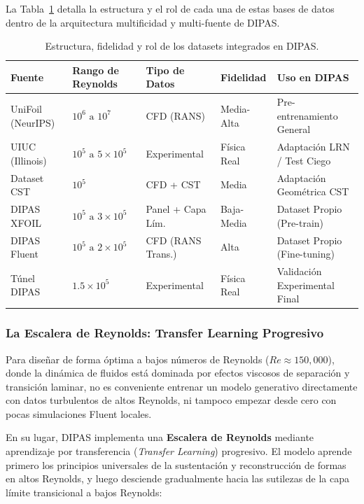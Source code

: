 \begin{enumerate}
La Tabla~\ref{tab:datasets_multifidelidad} detalla la estructura y el rol de cada una de estas bases de datos dentro de la arquitectura multificidad y multi-fuente de DIPAS.

\begin{table}[htbp]
\centering
\caption{Estructura, fidelidad y rol de los datasets integrados en DIPAS.}
\label{tab:datasets_multifidelidad}
\small
\begin{tabular}{@{}lllll@{}}
\toprule
\textbf{Fuente} & \textbf{Rango de Reynolds} & \textbf{Tipo de Datos} & \textbf{Fidelidad} & \textbf{Uso en DIPAS} \\ \midrule
UniFoil (NeurIPS) & $10^6\text{ a }10^7$ & CFD (RANS) & Media-Alta & Pre-entrenamiento General \\
UIUC (Illinois) & $10^5\text{ a }5\times 10^5$ & Experimental & Física Real & Adaptación LRN / Test Ciego \\
Dataset CST & $10^5$ & CFD + CST & Media & Adaptación Geométrica CST \\
DIPAS XFOIL & $10^5\text{ a }3\times 10^5$ & Panel + Capa Lím. & Baja-Media & Dataset Propio (Pre-train) \\
DIPAS Fluent & $10^5\text{ a }2\times 10^5$ & CFD (RANS Trans.) & Alta & Dataset Propio (Fine-tuning) \\
Túnel DIPAS & $1.5\times 10^5$ & Experimental & Física Real & Validación Experimental Final \\ \bottomrule
\end{tabular}
\end{table}

\subsubsection{La Escalera de Reynolds: Transfer Learning Progresivo}
Para diseñar de forma óptima a bajos números de Reynolds ($Re \approx 150{,}000$), donde la dinámica de fluidos está dominada por efectos viscosos de separación y transición laminar, no es conveniente entrenar un modelo generativo directamente con datos turbulentos de altos Reynolds, ni tampoco empezar desde cero con pocas simulaciones Fluent locales. 

En su lugar, DIPAS implementa una \textbf{Escalera de Reynolds} mediante aprendizaje por transferencia (\textit{Transfer Learning}) progresivo. El modelo aprende primero los principios universales de la sustentación y reconstrucción de formas en altos Reynolds, y luego desciende gradualmente hacia las sutilezas de la capa límite transicional a bajos Reynolds:


\end{enumerate}
